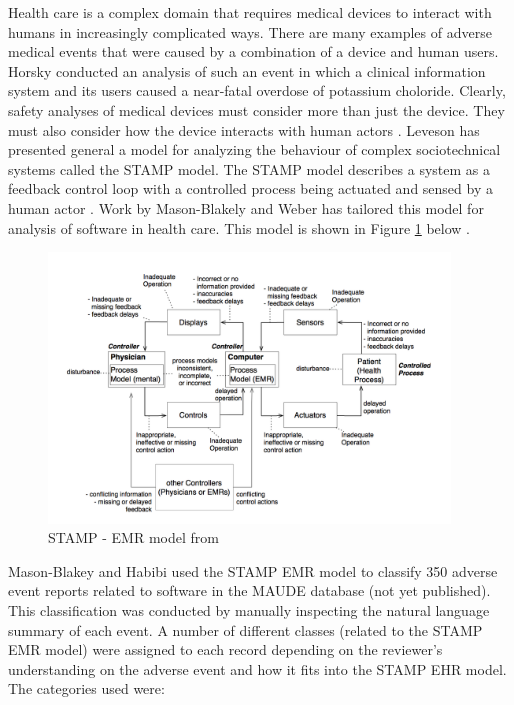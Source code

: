 \documentclass[11pt, notitlepage,abstracton,oneside]{article}   	%
\begin{document}
Health care is a complex domain that requires medical devices to interact with humans in increasingly complicated ways. There are many examples of adverse medical events that were caused by a combination of a device and human users. Horsky conducted an analysis of such an event \cite{horsky_2005} in which a clinical information system and its users caused a near-fatal overdose of potassium choloride. Clearly, safety analyses of medical devices must consider more than just the device. They must also consider how the device interacts with human actors \cite{karsh_health_2010}. Leveson has presented general a model for analyzing the behaviour of complex sociotechnical systems called the STAMP model. The STAMP model describes a system as a feedback control loop with a controlled process being actuated and sensed by a human actor \cite{leveson_engineering_2012}. Work by Mason-Blakely and Weber has tailored this model for analysis of software in health care. This model is shown in Figure \ref{fig:stamp-emr} below \cite{stamp_emr_2011}.

\begin{figure}[ht]
	\centering
	\includegraphics[width=0.95\textwidth]{figures/stamp-emr}
	\caption{STAMP - EMR model from \cite{stamp_emr_2011}}
	\label{fig:stamp-emr}
\end{figure}

Mason-Blakey and Habibi used the STAMP EMR model to classify 350 adverse event reports related to software in the MAUDE database (not yet published). This classification was conducted by manually inspecting the natural language summary of each event. A number of different classes (related to the STAMP EMR model) were assigned to each record depending on the reviewer's understanding on the adverse event and how it fits into the STAMP EHR model. The categories used were: 
\end{document}
